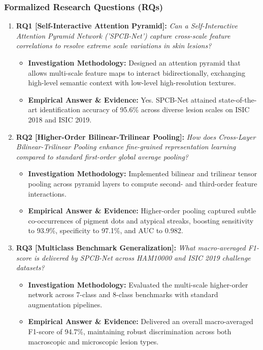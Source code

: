 \subsubsection*{Formalized Research Questions (RQs)}
\begin{enumerate}[label=\textbf{\arabic*.}, leftmargin=*]
  \item \textbf{RQ1 [Self-Interactive Attention Pyramid]:} \textit{Can a Self-Interactive Attention Pyramid Network ('SPCB-Net') capture cross-scale feature correlations to resolve extreme scale variations in skin lesions?}
  \begin{itemize}[leftmargin=1.5em]
    \item \textbf{Investigation Methodology:} Designed an attention pyramid that allows multi-scale feature maps to interact bidirectionally, exchanging high-level semantic context with low-level high-resolution textures.
    \item \textbf{Empirical Answer \& Evidence:} Yes. SPCB-Net attained state-of-the-art identification accuracy of 95.6\% across diverse lesion scales on ISIC 2018 and ISIC 2019.
  \end{itemize}
  \item \textbf{RQ2 [Higher-Order Bilinear-Trilinear Pooling]:} \textit{How does Cross-Layer Bilinear-Trilinear Pooling enhance fine-grained representation learning compared to standard first-order global average pooling?}
  \begin{itemize}[leftmargin=1.5em]
    \item \textbf{Investigation Methodology:} Implemented bilinear and trilinear tensor pooling across pyramid layers to compute second- and third-order feature interactions.
    \item \textbf{Empirical Answer \& Evidence:} Higher-order pooling captured subtle co-occurrences of pigment dots and atypical streaks, boosting sensitivity to 93.9\%, specificity to 97.1\%, and AUC to 0.982.
  \end{itemize}
  \item \textbf{RQ3 [Multiclass Benchmark Generalization]:} \textit{What macro-averaged F1-score is delivered by SPCB-Net across HAM10000 and ISIC 2019 challenge datasets?}
  \begin{itemize}[leftmargin=1.5em]
    \item \textbf{Investigation Methodology:} Evaluated the multi-scale higher-order network across 7-class and 8-class benchmarks with standard augmentation pipelines.
    \item \textbf{Empirical Answer \& Evidence:} Delivered an overall macro-averaged F1-score of 94.7\%, maintaining robust discrimination across both macroscopic and microscopic lesion types.

\end{itemize}
\end{enumerate}
